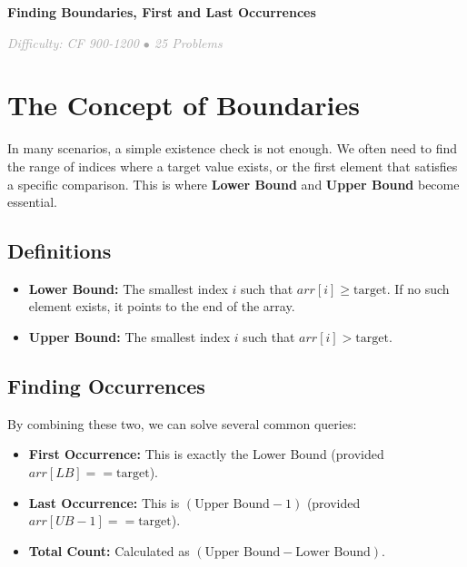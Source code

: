 \documentclass[11pt,a4paper,oneside]{book}
\begin{document}
\begin{tcolorbox}[
    enhanced,
    colback=white,
    colframe=secondaryblue,
    boxrule=1pt,
    arc=2mm,
    left=10pt,
    right=10pt
]
\textbf{\large\textcolor{primaryblue}{Finding Boundaries, First and Last Occurrences}}
\end{tcolorbox}

\vspace{0.5cm}

\begin{center}
\textit{\textcolor{darkgray}{Difficulty: CF 900-1200 $\bullet$ 25 Problems}}
\end{center}

\section{The Concept of Boundaries}

In many scenarios, a simple existence check is not enough. We often need to find the range of indices where a target value exists, or the first element that satisfies a specific comparison. This is where \textbf{Lower Bound} and \textbf{Upper Bound} become essential.



\subsection{Definitions}
\begin{itemize}[leftmargin=*, itemsep=5pt]
    \item \textbf{Lower Bound:} The smallest index $i$ such that $arr[i] \geq \text{target}$. If no such element exists, it points to the end of the array.
    \item \textbf{Upper Bound:} The smallest index $i$ such that $arr[i] > \text{target}$. 
\end{itemize}

\subsection{Finding Occurrences}
By combining these two, we can solve several common queries:
\begin{itemize}
    \item \textbf{First Occurrence:} This is exactly the Lower Bound (provided $arr[LB] == \text{target}$).
    \item \textbf{Last Occurrence:} This is $(\text{Upper Bound} - 1)$ (provided $arr[UB-1] == \text{target}$).
    \item \textbf{Total Count:} Calculated as $(\text{Upper Bound} - \text{Lower Bound})$.
\end{itemize}
\end{document}
